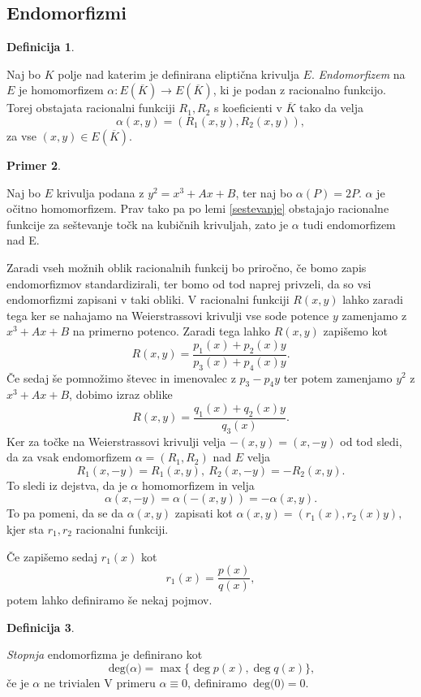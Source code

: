 \documentclass[12pt,a4paper,twoside]{article}
\theoremstyle{definition} %
\newtheorem{definicija}{Definicija}[section]
\newtheorem{primer}[definicija]{Primer}
\theoremstyle{plain} %
\numberwithin{equation}{section}  %
\newcommand{\E}[1]{E({#1})}
\newcommand{\DEG}[1]{\ \text{deg(}{#1}\text{)}}
\begin{document}
\subsection{Endomorfizmi}

\begin{definicija}~

Naj bo $K$ polje nad katerim je definirana eliptična krivulja $E$.
\emph{Endomorfizem} na $E$ je homomorfizem $\alpha: \E{\overline{K}} \rightarrow \E{\overline{K}} $, ki je podan z racionalno funkcijo. Torej obstajata racionalni funkciji $R_1,R_2$ s koeficienti v $\overline{K}$ tako da velja
$$\alpha(x,y) = (R_1(x,y),R_2(x,y)),$$
za vse $(x,y) \in \E{\overline{K}}$.
\end{definicija}

\begin{primer}~

Naj bo $E$ krivulja podana z $y^2 = x^3+Ax+B$, ter naj bo $\alpha(P) = 2P$. $\alpha$ je očitno homomorfizem. Prav tako pa po lemi \ref{sestevanje} obstajajo racionalne funkcije za seštevanje točk na kubičnih krivuljah, zato je $\alpha$ tudi endomorfizem nad E.
\end{primer}

Zaradi vseh možnih oblik racionalnih funkcij bo priročno, če bomo zapis endomorfizmov standardizirali, ter bomo od tod naprej privzeli, da so vsi endomorfizmi zapisani v taki obliki.
V racionalni funkciji $R(x,y)$ lahko zaradi tega ker se nahajamo na Weierstrassovi krivulji vse sode potence $y$ zamenjamo z $x^3+Ax+B$ na primerno potenco. Zaradi tega lahko $R(x,y)$ zapišemo kot
$$R(x,y) = \frac{p_1(x)+p_2(x)y}{p_3(x)+p_4(x)y}.$$
Če sedaj še pomnožimo števec in imenovalec z $p_3-p_4y$ ter potem zamenjamo $y^2$ z $x^3+Ax+B$, dobimo izraz oblike
$$R(x,y) = \frac{q_1(x)+q_2(x)y}{q_3(x)}.$$
Ker za točke na Weierstrassovi krivulji velja $-(x,y) = (x,-y)$ od tod sledi, da za vsak endomorfizem $\alpha = (R_1,R_2) $ nad $E$ velja
$$R_1(x,-y) = R_1(x,y), \ R_2(x,-y) = -R_2(x,y).$$
To sledi iz dejstva, da je $\alpha$ homomorfizem in velja
$$\alpha(x,-y) = \alpha(-(x,y)) = -\alpha(x,y).$$
To pa pomeni, da se da $\alpha(x,y)$ zapisati kot
$\alpha(x,y) = (r_1(x),r_2(x)y),$
kjer sta $r_1,r_2$ racionalni funkciji.

Če zapišemo sedaj $r_1(x)$ kot
$$r_1(x) = \frac{p(x)}{q(x)},$$
potem lahko definiramo še nekaj pojmov. 

\begin{definicija}~

\emph{Stopnja} endomorfizma je  definirano kot
$$\DEG{\alpha} = \max \{ \deg{p(x)},\deg{q(x)} \},$$
če je $\alpha$ ne trivialen V primeru $\alpha \equiv 0$, definiramo $\DEG{0} = 0$.
\end{definicija}
\end{document}
